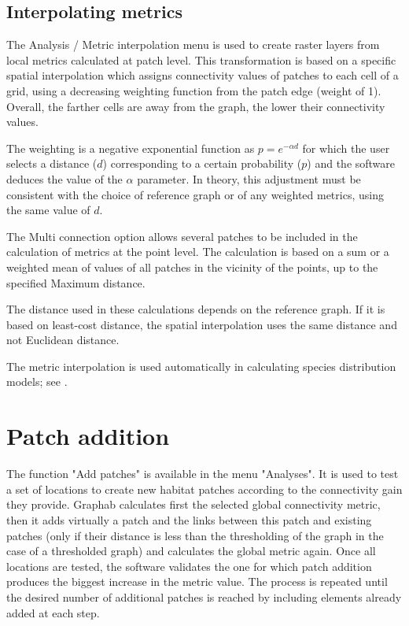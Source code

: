 \documentclass{article}
\begin{document}
\subsection{Interpolating metrics}

The Analysis / Metric interpolation menu is used to create raster layers from local metrics calculated at patch level. This transformation is based on a specific spatial interpolation which assigns connectivity values of patches to each cell of a grid, using a decreasing weighting function from the patch edge (weight of 1). Overall, the farther cells are away from the graph, the lower their connectivity values. 

The weighting is a negative exponential function as $p={e}^{-\mathit{\alpha d}}$ for which the user selects a distance ($d$) corresponding to a certain probability ($p$) and the software deduces the value of the $\alpha$ parameter. In theory, this adjustment must be consistent with the choice of reference graph or of any weighted metrics, using the same value of $d$. 

The Multi connection option allows several patches to be included in the calculation of metrics at the point level. The calculation is based on a sum or a weighted mean of values of all patches in the vicinity of the points, up to the specified Maximum distance. 

The distance used in these calculations depends on the reference graph. If it is based on least-cost distance, the spatial interpolation uses the same distance and not Euclidean distance.

The metric interpolation is used automatically in calculating species distribution models; see .


\section{Patch addition}

The function "Add patches" is available in the menu "Analyses". It is used to test a set of locations to create new habitat patches according to the connectivity gain they provide. Graphab calculates first the selected global connectivity metric, then it adds virtually a patch and the links between this patch and existing patches (only if their distance is less than the thresholding of the graph in the case of a thresholded graph) and calculates the global metric again. Once all locations are tested, the software validates the one for which patch addition produces the biggest increase in the metric value. The process is repeated until the desired number of additional patches is reached by including elements already added at each step.
\end{document}
